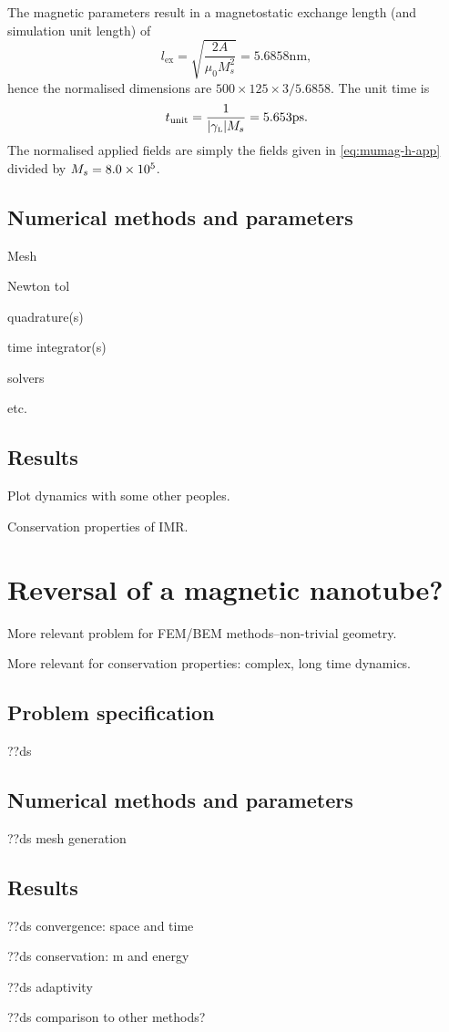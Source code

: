 The magnetic parameters result in a magnetostatic exchange length (and simulation unit length) of
\begin{equation}
  l_{\text{ex}} = \sqrt{\frac{2A}{\mu_0 M_s^2}} = 5.6858\text{nm},
\end{equation}
hence the normalised dimensions are $500 \times 125 \times 3 / 5.6858$.
The unit time is
\begin{equation}
  t_{\text{unit}} = \frac{1}{{\left|{\gamma_{\text{\tiny{L}}}} \right|} M_s} = 5.653\text{ps}.
\end{equation}
The normalised applied fields are simply the fields given in \cref{eq:mumag-h-app} divided by $M_s = 8.0\times 10^{5}$.

\subsection{Numerical methods and parameters}

Mesh

Newton tol

quadrature(s)

time integrator(s)

solvers

etc.


\subsection{Results}

Plot dynamics with some other peoples.

Conservation properties of IMR.


\section{Reversal of a magnetic nanotube?}

More relevant problem for FEM/BEM methods--non-trivial geometry.

More relevant for conservation properties: complex, long time dynamics.


\subsection{Problem specification}

??ds


\subsection{Numerical methods and parameters}

??ds mesh generation



\subsection{Results}

??ds convergence: space and time


??ds conservation: m and energy


??ds adaptivity


??ds comparison to other methods?


